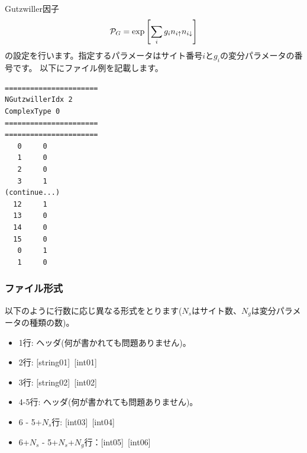 Gutzwiller因子
\begin{equation}
{\cal P}_G=\exp\left[ \sum_i g_i n_{i\uparrow} n_{i\downarrow} \right]
\end{equation}
の設定を行います。指定するパラメータはサイト番号$i$と$g_i$の変分パラメータの番号です。
以下にファイル例を記載します。

\begin{minipage}{12.5cm}
\begin{screen}
\begin{verbatim}
======================
NGutzwillerIdx 2  
ComplexType 0
====================== 
====================== 
   0     0
   1     0
   2     0
   3     1
(continue...)
  12     1
  13     0
  14     0
  15     0
   0     1
   1     0
\end{verbatim}
\end{screen}
\end{minipage}

\subsubsection{ファイル形式}
以下のように行数に応じ異なる形式をとります($N_s$はサイト数、$N_g$は変分パラメータの種類の数)。
 \begin{itemize}
   \item  1行:  ヘッダ(何が書かれても問題ありません)。
   \item  2行:   [string01]~[int01]
   \item  3行:   [string02]~[int02]
   \item  4-5行:  ヘッダ(何が書かれても問題ありません)。
   \item  6 - 5+$N_s$行: [int03]~[int04]
   \item  6+$N_s$ - 5+$N_s$+$N_g$行：[int05]~[int06]
  \end{itemize}
